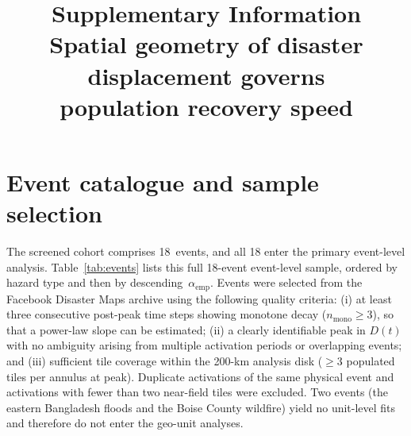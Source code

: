 \documentclass[11pt]{article}
\title{Supplementary Information\\[4pt]
Spatial geometry of disaster displacement governs\\
population recovery speed}
\author{}
\date{}
\newcommand{\aemp}{\alpha_{\mathrm{emp}}}
\begin{document}
\maketitle

\setcounter{section}{0}
\renewcommand{\thesection}{S\arabic{section}}
\renewcommand{\thetable}{S\arabic{table}}
\renewcommand{\thefigure}{S\arabic{figure}}

\section{Event catalogue and sample selection}
\label{sec:si_events}

The screened cohort comprises 18~events, and all 18 enter the
primary event-level analysis. Table~\ref{tab:events} lists this
full 18-event event-level sample, ordered by hazard type and then by
descending~$\aemp$. Events were selected from the
Facebook Disaster Maps archive using
the following quality criteria: (i) at least three consecutive
post-peak time steps showing monotone decay ($n_{\mathrm{mono}} \geq 3$),
so that a power-law slope can be estimated; (ii) a clearly identifiable
peak in $D(t)$ with no ambiguity arising from multiple activation
periods or overlapping events; and (iii) sufficient tile coverage within
the 200-km analysis disk ($\geq 3$ populated tiles per annulus at peak).
Duplicate activations of the same physical event and activations with
fewer than two near-field tiles were excluded. Two events (the eastern
Bangladesh floods and the Boise County wildfire) yield no unit-level
fits and therefore do not enter the geo-unit analyses.
\end{document}
